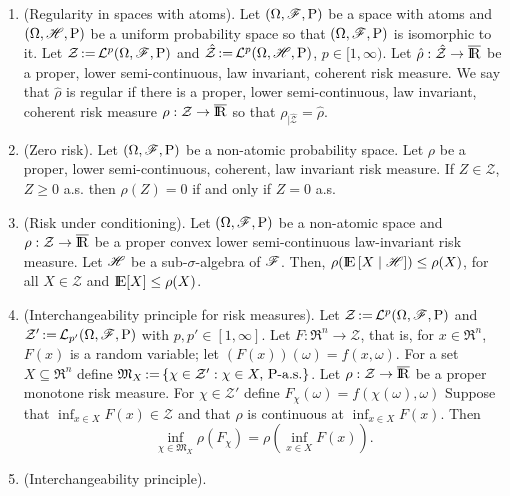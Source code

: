 \documentclass[a4paper,10pt]{article}
\newcommand{\ce}[1]{\E\left[#1 {}\mid{} \HH \right]}
\begin{document}
\begin{enumerate}
 \item (Regularity in spaces with atoms). Let $(\Omega,\mathscr{F},\mathrm{P})$ be a space with atoms and 
       $(\Omega, \mathscr{H}, \mathrm{P})$ be a uniform probability space so that $(\Omega,\mathscr{F},\mathrm{P})$ is 
       isomorphic to it. 
       Let $\mathcal{Z}{}\mathop{\mathrel{:}=}{} \mathcal{L}^p(\Omega,\mathscr{F},\mathrm{P})$ and $\hat{\mathcal{Z}} {}\mathop{\mathrel{:}=}{} 
       \mathcal{L}^p(\Omega, \mathscr{H}, \mathrm{P})$, $p\in[1,\infty)$. 
       Let $\hat{\rho}:\hat{\mathcal{Z}}\to\barre$ be a proper, lower semi-continuous,
       law invariant, coherent risk measure. We say that $\hat{\rho}$ is regular 
       if there is a proper, lower semi-continuous, law invariant, coherent 
       risk measure $\rho:\mathcal{Z}\to\barre$ so that $\rho_{|\hat{\mathcal{Z}}}=\hat{\rho}$.
       
 \item (Zero risk). Let $(\Omega,\mathscr{F},\mathrm{P})$ be a non-atomic probability space. Let $\rho$ be a proper, lower semi-continuous,
       coherent, law invariant risk measure. If $Z\in\mathcal{Z}$, $Z\geq 0$ a.s. then $\rho(Z)=0$ if and only if $Z=0$ a.s.
 \item (Risk under conditioning). Let $(\Omega,\mathscr{F},\mathrm{P})$ be a non-atomic space and $\rho:\mathcal{Z}\to\barre$ be a 
        proper convex lower semi-continuous  law-invariant risk measure. Let $\mathscr{H}$ be a sub-$\sigma$-algebra 
        of $\mathscr{F}$. Then, $\rho(\ce{X})\leq \rho(X)$, for all $X\in\mathcal{Z}$ and $\E[X]\leq \rho(X)$.
  \item (Interchangeability principle for risk measures). Let $\mathcal{Z}{}\mathop{\mathrel{:}=}{} \mathcal{L}^p(\Omega,\mathscr{F},\mathrm{P})$ and 
       $\mathcal{Z}' {}\mathop{\mathrel{:}=}{} \mathcal{L}_{p'}(\Omega,\mathscr{F},\mathrm{P})$ with $p,p'\in[1,\infty]$. 
       Let $F:\Re^n\to\mathcal{Z}$, that is, for $x\in\Re^n$, $F(x)$ is a random variable; let
       $(F(x))(\omega)=f(x,\omega)$. For a set $X\subseteq \Re^n$ define 
       $\mathfrak{M}_X {}\mathop{\mathrel{:}=}{} \{\chi \in \mathcal{Z}': \chi \in X,\, \mathrm{P}\text{-a.s.}\}$.
       Let $\rho:\mathcal{Z}\to\barre$ be a proper monotone risk measure. 
       For $\chi\in\mathcal{Z}'$ define $F_\chi(\omega) = f(\chi(\omega), \omega)$
       Suppose that $\inf_{x\in X}F(x) \in \mathcal{Z}$
       and that $\rho$ is continuous at $\inf_{x\in X}F(x)$. Then
       \[
        \inf_{\chi \in \mathfrak{M}_X} \rho(F_\chi) = \rho\left(\inf_{x\in X}F(x)\right).
       \]
 \item (Interchangeability principle).        
\end{enumerate}
\end{document}
